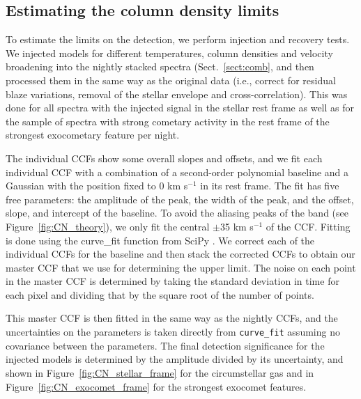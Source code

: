 \documentclass{aa}
\newcommand{\kms}{km s$^{-1}$}
\begin{document}

\subsection{Estimating the  column density limits}\label{sect:CNlim}

To estimate the limits on the  detection, we perform injection and recovery tests.
%
We injected models for different temperatures, column densities and velocity broadening into the nightly stacked spectra (Sect.~\ref{sect:comb}, and then processed them in the same way as the original data (i.e., correct for residual blaze variations, removal of the stellar envelope and cross-correlation).
%
This was done for all spectra with the injected signal in the stellar rest frame as well as for the sample of spectra with strong cometary activity in the rest frame of the strongest exocometary feature per night.

The individual CCFs show some overall slopes and offsets, and we fit each individual CCF with a combination of a second-order polynomial baseline and a Gaussian with the position fixed to 0 \kms{} in its rest frame.
%
The fit has five free parameters: the amplitude of the peak, the width of the peak, and the offset, slope, and intercept of the baseline.
%
To avoid the aliasing peaks of the  band (see Figure~\ref{fig:CN_theory}), we only fit the central $\pm$35 \kms{} of the CCF.
%
Fitting is done using the curve\_fit function from SciPy \citep{2020SciPy-NMeth}.
%
We correct each of the individual CCFs for the baseline and then stack the corrected CCFs to obtain our master CCF that we use for determining the upper limit.
%
The noise on each point in the master CCF is determined by taking the standard deviation in time for each pixel and dividing that by the square root of the number of points.

This master CCF is then fitted in the same way as the nightly CCFs, and the uncertainties on the parameters is taken directly from {\tt curve\_fit} assuming no covariance between the parameters.
%
The final detection significance for the injected models is determined by the amplitude divided by its uncertainty, and shown in Figure~\ref{fig:CN_stellar_frame} for the circumstellar gas and in Figure~\ref{fig:CN_exocomet_frame} for the strongest exocomet features.
\end{document}
